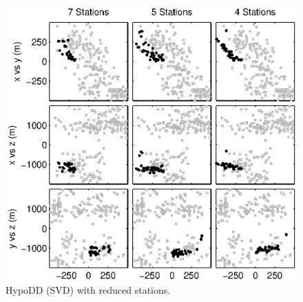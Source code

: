 \documentclass[extra]{gji}
\begin{document}
\begin{figure}
\includegraphics[height = 25pc]{diags/CalaverasLoc3_hypoDD_SVD.eps}
\caption{HypoDD (SVD) with reduced stations.}
\label{fig-HYPODDreducesstats}
\end{figure}


\end{document}
